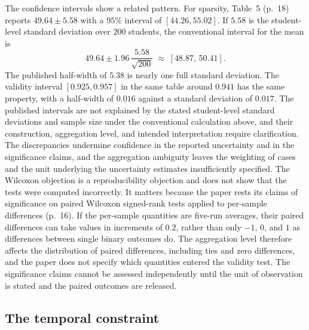 \documentclass[11pt]{article}
\begin{document}
The confidence intervals show a related pattern. For sparsity, Table~5 (p.~18) reports $49.64\pm5.58$ with a $95\%$ interval of $[44.26,55.02]$. If $5.58$ is the student-level standard deviation over $200$ students, the conventional interval for the mean is
\[
49.64\pm1.96\,\frac{5.58}{\sqrt{200}}\;\approx\;[48.87,\,50.41].
\]
The published half-width of $5.38$ is nearly one full standard deviation. The validity interval $[0.925,0.957]$ in the same table around $0.941$ has the same property, with a half-width of $0.016$ against a standard deviation of $0.017$. The published intervals are not explained by the stated student-level standard deviations and sample size under the conventional calculation above, and their construction, aggregation level, and intended interpretation require clarification. The discrepancies undermine confidence in the reported uncertainty and in the significance claims, and the aggregation ambiguity leaves the weighting of cases and the unit underlying the uncertainty estimates insufficiently specified. The Wilcoxon objection is a reproducibility objection and does not show that the tests were computed incorrectly. It matters because the paper rests its claims of significance on paired Wilcoxon signed-rank tests applied to per-sample differences (p.~16). If the per-sample quantities are five-run averages, their paired differences can take values in increments of $0.2$, rather than only $-1$, $0$, and $1$ as differences between single binary outcomes do. The aggregation level therefore affects the distribution of paired differences, including ties and zero differences, and the paper does not specify which quantities entered the validity test. The significance claims cannot be assessed independently until the unit of observation is stated and the paired outcomes are released.

\subsection{The temporal constraint}
\end{document}

